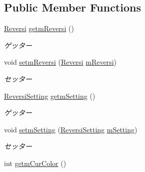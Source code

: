 \subsection*{Public Member Functions}
\begin{DoxyCompactItemize}
\item 
\hyperlink{classjp_1_1gr_1_1java__conf_1_1yuta__yoshinaga_1_1reversi_1_1model_1_1_reversi}{Reversi} \hyperlink{classjp_1_1gr_1_1java__conf_1_1yuta__yoshinaga_1_1reversi_1_1model_1_1_reversi_play_ad3265f5470fe37f7e5bcb8d8c59be247}{getm\+Reversi} ()
\begin{DoxyCompactList}\small\item\em ゲッター \end{DoxyCompactList}\item 
void \hyperlink{classjp_1_1gr_1_1java__conf_1_1yuta__yoshinaga_1_1reversi_1_1model_1_1_reversi_play_ad9b9866272492653c287d900bcad48e9}{setm\+Reversi} (\hyperlink{classjp_1_1gr_1_1java__conf_1_1yuta__yoshinaga_1_1reversi_1_1model_1_1_reversi}{Reversi} \hyperlink{classjp_1_1gr_1_1java__conf_1_1yuta__yoshinaga_1_1reversi_1_1model_1_1_reversi_play_aabf6cd8a17ae13f411290a1b91404782}{m\+Reversi})
\begin{DoxyCompactList}\small\item\em セッター \end{DoxyCompactList}\item 
\hyperlink{classjp_1_1gr_1_1java__conf_1_1yuta__yoshinaga_1_1reversi_1_1model_1_1_reversi_setting}{Reversi\+Setting} \hyperlink{classjp_1_1gr_1_1java__conf_1_1yuta__yoshinaga_1_1reversi_1_1model_1_1_reversi_play_a7190dc24d3704caf7a3c0e3c31ca69de}{getm\+Setting} ()
\begin{DoxyCompactList}\small\item\em ゲッター \end{DoxyCompactList}\item 
void \hyperlink{classjp_1_1gr_1_1java__conf_1_1yuta__yoshinaga_1_1reversi_1_1model_1_1_reversi_play_a8c791a59db891596f7358ddf66b1c2d9}{setm\+Setting} (\hyperlink{classjp_1_1gr_1_1java__conf_1_1yuta__yoshinaga_1_1reversi_1_1model_1_1_reversi_setting}{Reversi\+Setting} \hyperlink{classjp_1_1gr_1_1java__conf_1_1yuta__yoshinaga_1_1reversi_1_1model_1_1_reversi_play_a9158037bdd0bc36b25fddf7dec0b20f9}{m\+Setting})
\begin{DoxyCompactList}\small\item\em セッター \end{DoxyCompactList}\item 
int \hyperlink{classjp_1_1gr_1_1java__conf_1_1yuta__yoshinaga_1_1reversi_1_1model_1_1_reversi_play_a6469b82ef6888bc98e537ce3680f95da}{getm\+Cur\+Color} ()

\end{DoxyCompactItemize}
